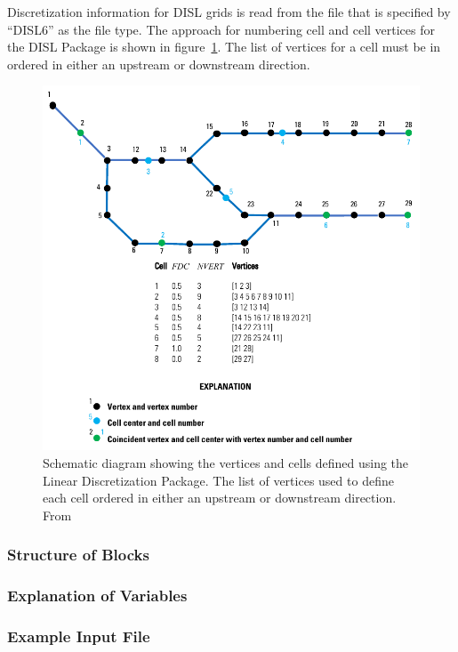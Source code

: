 Discretization information for DISL grids is read from the file that is specified by ``DISL6'' as the file type. The approach for numbering cell and cell vertices for the DISL Package is shown in figure~\ref{fig:disl_example}.  The list of vertices for a cell must be in ordered in either an upstream or downstream direction. 

\begin{figure}[ht]
	\centering
	\includegraphics[scale=1.0]{Figures/DISL_example}
	\caption{Schematic diagram showing the vertices and cells defined using the Linear Discretization Package. The list of vertices used to define each cell ordered in either an upstream or downstream direction.  From \cite{modflow6gwf}}
	\label{fig:disl_example}
\end{figure}


\vspace{5mm}
\subsubsection{Structure of Blocks}






\vspace{5mm}
\subsubsection{Explanation of Variables}
\begin{description}

\end{description}

\vspace{5mm}
\subsubsection{Example Input File}


